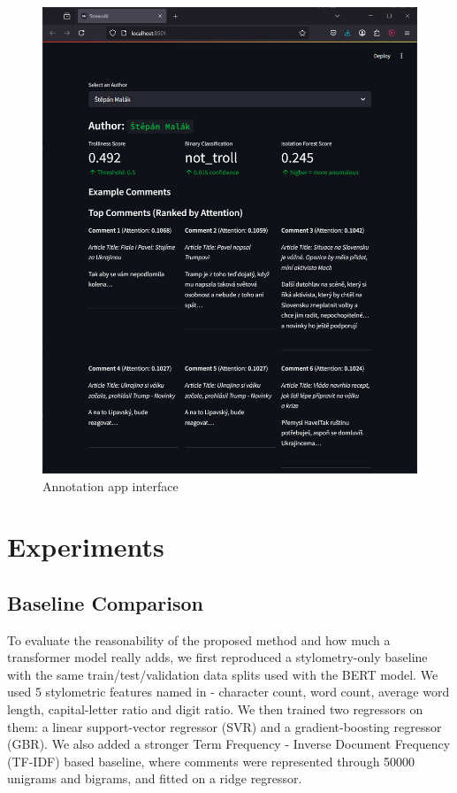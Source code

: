 \documentclass[twoside]{ctuthesis}
\theoremstyle{plain}
\theoremstyle{definition}
\theoremstyle{note}
\begin{document}
\begin{figure}[htbp]          
	\centering                 
	\includegraphics[scale=0.43]{figures/streamlit_app.png}
	\caption{Annotation app interface}    
	\label{fig:my_app}          
\end{figure}

\chapter{Experiments}

\section{Baseline Comparison}

To evaluate the reasonability of the proposed method and how much a transformer model really adds, we first reproduced a stylometry-only baseline with the same train/test/validation data splits used with the BERT model. We used 5 stylometric features named in \cite{Machova2021Algorithms} - character count, word count, average word length, capital-letter ratio and digit ratio. We then trained two regressors on them: a linear support-vector regressor (SVR) and a gradient-boosting regressor (GBR). We also added a stronger Term Frequency - Inverse Document Frequency (TF-IDF) based baseline, where comments were represented through 50000 unigrams and bigrams, and fitted on a ridge regressor.\par
\end{document}
